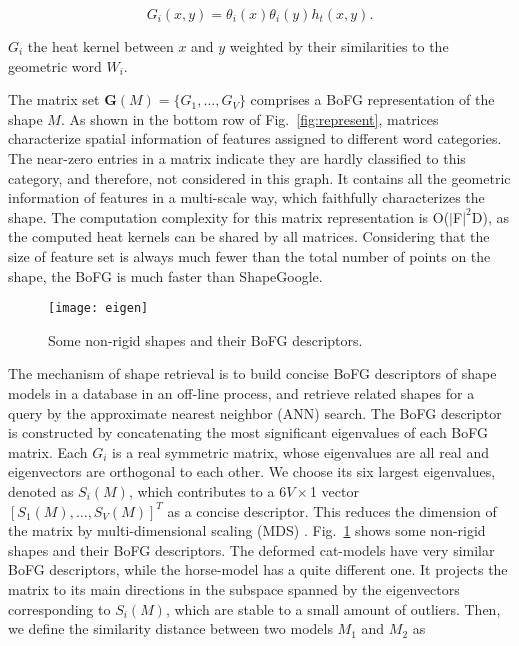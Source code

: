 \begin{equation}
G_i(x,y)=\theta_i(x)\theta_i(y)h_t(x,y).
\end{equation}

$G_i$ the heat kernel between $x$ and $y$ weighted by their similarities to the geometric word $W_i$.

The matrix set $\textbf{G}(M)=\{G_1,\dots,G_V\}$ comprises a BoFG representation of the shape $M$. 
As shown in the bottom row of Fig.~\ref{fig:represent}, matrices characterize spatial information 
of features assigned to different word categories. The near-zero entries in a matrix indicate 
they are hardly classified to this category, and therefore, not considered in this graph. 
It contains all the geometric information of features in a multi-scale way, which faithfully 
characterizes the shape. The computation complexity for this matrix representation 
is O($|$F$|^2$D), as the computed heat kernels can be shared by all matrices.
Considering that the size of feature set is always much fewer than the total number of points on the 
shape, the BoFG is much faster than ShapeGoogle.

\begin{figure}
\centering
\texttt{[image: eigen]}
\caption[Nonrigid shapes and their BoFG descriptors.]
{Some non-rigid shapes and their BoFG descriptors.}
\label{fig:eigen}
\end{figure}

The mechanism of shape retrieval is to build concise BoFG descriptors of shape models in a database 
in an off-line process, and retrieve related shapes for a query by the approximate nearest neighbor 
(ANN) search. The BoFG descriptor is constructed by concatenating the most significant eigenvalues of each BoFG matrix. 
Each $G_i$ is a real symmetric matrix, whose eigenvalues are all real and eigenvectors are orthogonal to each other. 
We choose its six largest eigenvalues, denoted as $S_i(M)$, which contributes to a $6V \times$1 vector $[S_1(M),\dots,S_V(M)]^T$ 
as a concise descriptor. This reduces the dimension of the matrix by multi-dimensional scaling (MDS) \cite{Bronstein2006}. 
Fig.~\ref{fig:eigen} shows some non-rigid shapes and their BoFG descriptors. The deformed cat-models 
have very similar BoFG descriptors, while the horse-model has a quite different one. It projects the matrix to 
its main directions in the subspace spanned by the eigenvectors corresponding to $S_i(M)$, 
which are stable to a small amount of outliers. Then, we define the similarity distance between two models $M_1$ and $M_2$ as

